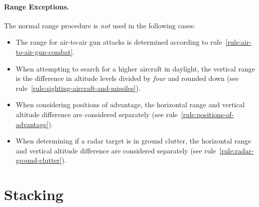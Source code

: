 {\paragraph{Range Exceptions.}
The normal range procedure is \emph{not} used in the following cases:
\begin{itemize}

\item
The range for air-to-air gun attacks is determined according to rule~\ref{rule:air-to-air-gun-combat}.

\item
When attempting to search for a higher aircraft in daylight, the vertical range is the difference in altitude levels divided by \emph{four} and rounded down (see rule~\ref{rule:sighting-aircraft-and-missiles}).

\item
When considering positions of advantage, the horizontal range and vertical altitude difference are considered separately (see rule~\ref{rule:positions-of-advantage}).

\item
When determining if a radar target is in ground clutter, the horizontal range and vertical altitude difference are considered separately (see rule~\ref{rule:radar-ground-clutter}).

\end{itemize}

}

\section{Stacking}


